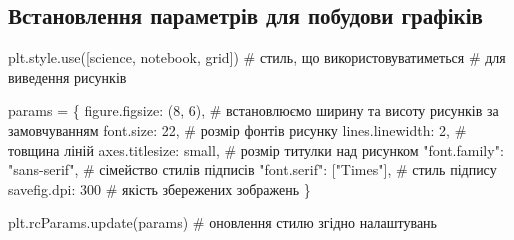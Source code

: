 \documentclass[
  letterpaper,
]{report}
\newenvironment{Shaded}{\begin{snugshade}}{\end{snugshade}}
\newcommand{\CommentTok}[1]{\textcolor[rgb]{0.37,0.37,0.37}{#1}}
\newcommand{\DecValTok}[1]{\textcolor[rgb]{0.68,0.00,0.00}{#1}}
\newcommand{\NormalTok}[1]{\textcolor[rgb]{0.00,0.23,0.31}{#1}}
\newcommand{\OperatorTok}[1]{\textcolor[rgb]{0.37,0.37,0.37}{#1}}
\newcommand{\StringTok}[1]{\textcolor[rgb]{0.13,0.47,0.30}{#1}}
\begin{document}
\hypertarget{ux432ux441ux442ux430ux43dux43eux432ux43bux435ux43dux43dux44f-ux43fux430ux440ux430ux43cux435ux442ux440ux456ux432-ux434ux43bux44f-ux43fux43eux431ux443ux434ux43eux432ux438-ux433ux440ux430ux444ux456ux43aux456ux432}{%
\subsection{Встановлення параметрів для побудови
графіків}\label{ux432ux441ux442ux430ux43dux43eux432ux43bux435ux43dux43dux44f-ux43fux430ux440ux430ux43cux435ux442ux440ux456ux432-ux434ux43bux44f-ux43fux43eux431ux443ux434ux43eux432ux438-ux433ux440ux430ux444ux456ux43aux456ux432}}

\begin{Shaded}
\begin{Highlighting}[]
\NormalTok{plt.style.use([}\StringTok{\textquotesingle{}science\textquotesingle{}}\NormalTok{, }\StringTok{\textquotesingle{}notebook\textquotesingle{}}\NormalTok{, }\StringTok{\textquotesingle{}grid\textquotesingle{}}\NormalTok{]) }\CommentTok{\# стиль, що використовуватиметься}
                                               \CommentTok{\# для виведення рисунків}

\NormalTok{params }\OperatorTok{=}\NormalTok{ \{}
    \StringTok{\textquotesingle{}figure.figsize\textquotesingle{}}\NormalTok{: (}\DecValTok{8}\NormalTok{, }\DecValTok{6}\NormalTok{),         }\CommentTok{\# встановлюємо ширину та висоту рисунків за замовчуванням}
    \StringTok{\textquotesingle{}font.size\textquotesingle{}}\NormalTok{: }\DecValTok{22}\NormalTok{,                  }\CommentTok{\# розмір фонтів рисунку}
    \StringTok{\textquotesingle{}lines.linewidth\textquotesingle{}}\NormalTok{: }\DecValTok{2}\NormalTok{,             }\CommentTok{\# товщина ліній}
    \StringTok{\textquotesingle{}axes.titlesize\textquotesingle{}}\NormalTok{: }\StringTok{\textquotesingle{}small\textquotesingle{}}\NormalTok{,        }\CommentTok{\# розмір титулки над рисунком}
    \StringTok{"font.family"}\NormalTok{: }\StringTok{"sans{-}serif"}\NormalTok{,      }\CommentTok{\# сімейство стилів підписів }
    \StringTok{"font.serif"}\NormalTok{: [}\StringTok{"Times"}\NormalTok{],          }\CommentTok{\# стиль підпису}
    \StringTok{\textquotesingle{}savefig.dpi\textquotesingle{}}\NormalTok{: }\DecValTok{300}                \CommentTok{\# якість збережених зображень}
\NormalTok{\}}

\NormalTok{plt.rcParams.update(params)           }\CommentTok{\# оновлення стилю згідно налаштувань}
\end{Highlighting}
\end{Shaded}
\end{document}
